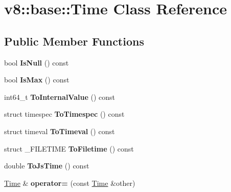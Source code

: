\hypertarget{classv8_1_1base_1_1_time}{}\section{v8\+:\+:base\+:\+:Time Class Reference}
\label{classv8_1_1base_1_1_time}
\subsection*{Public Member Functions}
\begin{DoxyCompactItemize}
\item 
bool {\bfseries Is\+Null} () const \hypertarget{classv8_1_1base_1_1_time_a052ff12b5ec66a2cf8c8094239b243d9}{}\label{classv8_1_1base_1_1_time_a052ff12b5ec66a2cf8c8094239b243d9}

\item 
bool {\bfseries Is\+Max} () const \hypertarget{classv8_1_1base_1_1_time_ac6a3b1faa1b75f108d0215666d480893}{}\label{classv8_1_1base_1_1_time_ac6a3b1faa1b75f108d0215666d480893}

\item 
int64\+\_\+t {\bfseries To\+Internal\+Value} () const \hypertarget{classv8_1_1base_1_1_time_adde48782635cebe3e0c34ac274fb97c2}{}\label{classv8_1_1base_1_1_time_adde48782635cebe3e0c34ac274fb97c2}

\item 
struct timespec {\bfseries To\+Timespec} () const \hypertarget{classv8_1_1base_1_1_time_a993c9d3eef62f937b1cd59016a44748a}{}\label{classv8_1_1base_1_1_time_a993c9d3eef62f937b1cd59016a44748a}

\item 
struct timeval {\bfseries To\+Timeval} () const \hypertarget{classv8_1_1base_1_1_time_a0663f6b04c5b091d43603401a5936c13}{}\label{classv8_1_1base_1_1_time_a0663f6b04c5b091d43603401a5936c13}

\item 
struct \+\_\+\+F\+I\+L\+E\+T\+I\+ME {\bfseries To\+Filetime} () const \hypertarget{classv8_1_1base_1_1_time_a61c22b1b1ba016f87651951662dcd7b5}{}\label{classv8_1_1base_1_1_time_a61c22b1b1ba016f87651951662dcd7b5}

\item 
double {\bfseries To\+Js\+Time} () const \hypertarget{classv8_1_1base_1_1_time_abd32aab20115c733ad6ec975b2045b9f}{}\label{classv8_1_1base_1_1_time_abd32aab20115c733ad6ec975b2045b9f}

\item 
\hyperlink{classv8_1_1base_1_1_time}{Time} \& {\bfseries operator=} (const \hyperlink{classv8_1_1base_1_1_time}{Time} \&other)\hypertarget{classv8_1_1base_1_1_time_aee7a523bff4aa3b32f565d0460e23622}{}\label{classv8_1_1base_1_1_time_aee7a523bff4aa3b32f565d0460e23622}


\end{DoxyCompactItemize}
